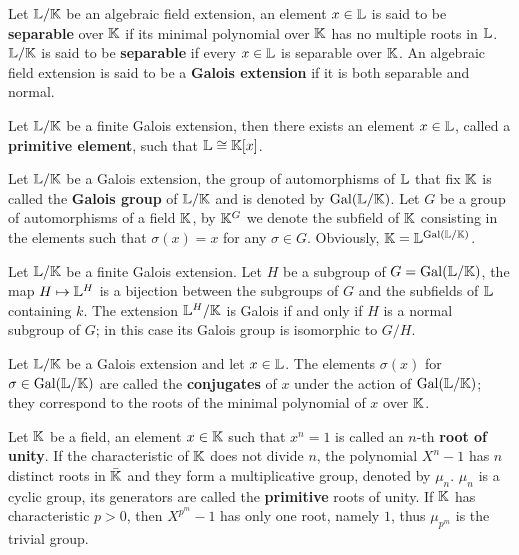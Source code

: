 Let $\mathbb{L}/\mathbb{K}$ be an algebraic field extension, an element $x\in\mathbb{L}$ is
said to be  \textbf{separable} over $\mathbb{K}$ if
its minimal polynomial over $\mathbb{K}$ has no multiple roots in $\mathbb{L}$.
$\mathbb{L}/\mathbb{K}$ is said to be 
 \textbf{separable} if every $x\in\mathbb{L}$ is
separable over $\mathbb{K}$. An algebraic field extension is said to be a
  \textbf{Galois
  extension} if it is both separable and normal.

\begin{theorem}
  Let $\mathbb{L}/\mathbb{K}$ be a finite Galois extension, then there exists an
  element $x\in\mathbb{L}$, called a
  \textbf{primitive element}, such that
  $\mathbb{L}\cong\mathbb{K}[x]$.
\end{theorem}

Let $\mathbb{L}/\mathbb{K}$ be a Galois extension, the group of automorphisms of
$\mathbb{L}$ that fix $\mathbb{K}$ is called the \textbf{Galois
  group} of $\mathbb{L}/\mathbb{K}$ and is denoted by $\operatorname{Gal}(\mathbb{L}/\mathbb{K})$.  Let $G$ be a
group of automorphisms of a field $\mathbb{K}$, by $\mathbb{K}^G$ we denote the
subfield of $\mathbb{K}$ consisting in the elements such that $\sigma(x)=x$
for any $\sigma\in G$. Obviously, $\mathbb{K}=\mathbb{L}^{\operatorname{Gal}(\mathbb{L}/\mathbb{K})}$.

\begin{theorem}
  Let $\mathbb{L}/\mathbb{K}$ be a finite Galois extension. Let $H$ be a subgroup of
  $G=\operatorname{Gal}(\mathbb{L}/\mathbb{K})$, the map $H\mapsto \mathbb{L}^H$ is a bijection between
  the subgroups of $G$ and the subfields of $\mathbb{L}$ containing $k$. The
  extension $\mathbb{L}^H/\mathbb{K}$ is Galois if and only if $H$ is a normal
  subgroup of $G$; in this case its Galois group is isomorphic to
  $G/H$.
\end{theorem}

Let $\mathbb{L}/\mathbb{K}$ be a Galois extension and let $x\in\mathbb{L}$. The elements
$\sigma(x)$ for $\sigma\in\operatorname{Gal}(\mathbb{L}/\mathbb{K})$ are called the
\textbf{conjugates} of $x$ under the action
of $\operatorname{Gal}(\mathbb{L}/\mathbb{K})$; they correspond to the roots of the minimal
polynomial of $x$ over $\mathbb{K}$.

Let $\mathbb{K}$ be a field, an element $x\in \mathbb{K}$ such that $x^n=1$ is called
an $n$-th \textbf{root of unity}. If the
characteristic of $\mathbb{K}$ does not divide $n$, the polynomial $X^n-1$ has
$n$ distinct roots in $\bar{\mathbb{K}}$ and they form a multiplicative
group, denoted by $\mu_n$. $\mu_n$ is a cyclic group, its generators
are called the 
 \textbf{primitive} roots of unity.  If
$\mathbb{K}$ has characteristic $p>0$, then $X^{p^m}-1$ has only one root,
namely $1$, thus $\mu_{p^m}$ is the trivial group. 

